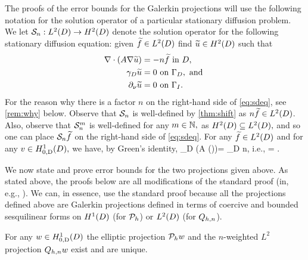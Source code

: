 The proofs of the error bounds for the Galerkin projections will use the following notation for the solution operator of a particular stationary diffusion problem. We let $\DeltaAI:\LtD\rightarrow\HtD$ denote the solution operator for the following stationary diffusion equation: given $\ftilde \in \LtD$ find $\utilde \in \HtD$ such that
\begin{subequations}
\begin{align}
\grad \cdot \mleft(A\grad \utilde\mright) &= -n\ftilde \text{ in } D,\label{eq:sdeq}\\
  \trD \utilde &= 0 \ton \GD,\tand\label{eq:sddbc}\\
\dn \utilde &= 0 \ton \GI.\label{eq:sdnbc}
\end{align}
\end{subequations}
For the reason why there is a factor $n$ on the right-hand side of \cref{eq:sdeq}, see \cref{rem:why} below. Observe that $\mathcal S_{n}$ is well-defined by \cref{thm:shift} as $n \ftilde \in \LtD$. Also, observe that $\mathcal S_{n}^{m}$ is well-defined for any $m \in \mathbb N,$ as $\HtD \subseteq \LtD,$ and so one can place $\mathcal S_{n} \widetilde{f}$ on the right-hand side of \cref{eq:sdeq}. 
For any $\ftilde \in \LtD$ and for any $v \in \HozDD,$ we have, by Green's identity,
\beqs
\int_D \mleft(A \grad \mleft(\DeltaAI\ftilde\mright)\mright)\cdot \grad \vb = \int_D n\ftilde \vb,
\eeqs
i.e.,
\beq\label{eq:deltaagreen}
 = .
\eeq




We now state and prove error bounds for the two projections given above. As stated above, the proofs below are all modifications of the standard proof (in, e.g., \cite[Theorem 5.8.3]{BrSc:08}). We can, in essence, use the standard proof because all the projections defined above are Galerkin projections defined in terms of coercive and bounded sesquilinear forms on $\HoD$ (for $\mathcal P_{h}$) or $\LtD$ (for $Q_{h,n}$).

\label{lem:eugp}
For any $w \in \HozDD$ the elliptic projection $\mathcal P_{h} w$ and the $n$-weighted $L^2$ projection $Q_{h,n} w$ exist and are unique.
\ele

